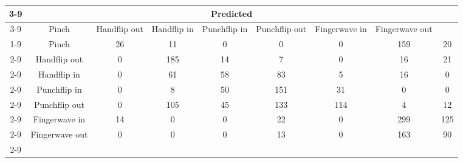 \documentclass{standalone}
\begin{document}
 
 \begin{tabular}{|c |c |c |c |c |c |c |c |c |}
\cline{3-9}\multicolumn{2}{c|}{} & \multicolumn{7}{c|}{Predicted} \\ 
\cline{3-9} \multicolumn{2}{c |}{ } & Pinch & Handflip out & Handflip in & Punchflip in & Punchflip out & Fingerwave in & Fingerwave out\\ 
\cline{1-9}\multirow{7}{*}{\rotatebox[origin=c]{90}{Actual}} & Pinch & 26 & 11 & 0 & 0 & 0 & 159 & 20\\ 
 \cline{2-9} & Handflip out & 0 & 185 & 14 & 7 & 0 & 16 & 21\\ 
 \cline{2-9} & Handflip in & 0 & 61 & 58 & 83 & 5 & 16 & 0\\ 
 \cline{2-9} & Punchflip in & 0 & 8 & 50 & 151 & 31 & 0 & 0\\ 
 \cline{2-9} & Punchflip out & 0 & 105 & 45 & 133 & 114 & 4 & 12\\ 
 \cline{2-9} & Fingerwave in & 14 & 0 & 0 & 22 & 0 & 299 & 125\\ 
 \cline{2-9} & Fingerwave out & 0 & 0 & 0 & 13 & 0 & 163 & 90\\ 
 \cline{2-9}\hline \end{tabular}
 
\end{document}
